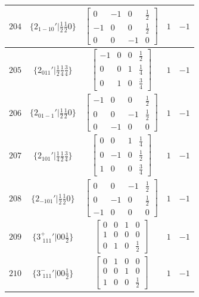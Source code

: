 \documentclass[fleqn,8pt]{jsarticle}
\begin{document}
\begin{longtable}{ccccc}
$ 204 $ & $ \{2{}_{1-10}{}'|\frac{1}{2} \frac{1}{2} 0\} $ & $ \begin{bmatrix} 0 & -1 & 0 & \frac{1}{2} \\ -1 & 0 & 0 & \frac{1}{2} \\ 0 & 0 & -1 & 0 \end{bmatrix} $ & $ 1 $ & $ -1 $ \\ \hline
$ 205 $ & $ \{2{}_{011}{}'|\frac{1}{2} \frac{1}{4} \frac{3}{4}\} $ & $ \begin{bmatrix} -1 & 0 & 0 & \frac{1}{2} \\ 0 & 0 & 1 & \frac{1}{4} \\ 0 & 1 & 0 & \frac{3}{4} \end{bmatrix} $ & $ 1 $ & $ -1 $ \\ \hline
$ 206 $ & $ \{2{}_{01-1}{}'|\frac{1}{2} \frac{1}{2} 0\} $ & $ \begin{bmatrix} -1 & 0 & 0 & \frac{1}{2} \\ 0 & 0 & -1 & \frac{1}{2} \\ 0 & -1 & 0 & 0 \end{bmatrix} $ & $ 1 $ & $ -1 $ \\ \hline
$ 207 $ & $ \{2{}_{101}{}'|\frac{1}{4} \frac{1}{2} \frac{3}{4}\} $ & $ \begin{bmatrix} 0 & 0 & 1 & \frac{1}{4} \\ 0 & -1 & 0 & \frac{1}{2} \\ 1 & 0 & 0 & \frac{3}{4} \end{bmatrix} $ & $ 1 $ & $ -1 $ \\ \hline
$ 208 $ & $ \{2{}_{-101}{}'|\frac{1}{2} \frac{1}{2} 0\} $ & $ \begin{bmatrix} 0 & 0 & -1 & \frac{1}{2} \\ 0 & -1 & 0 & \frac{1}{2} \\ -1 & 0 & 0 & 0 \end{bmatrix} $ & $ 1 $ & $ -1 $ \\ \hline
$ 209 $ & $ \{3^{+}_{\,\,111}{}'|0 0 \frac{1}{2}\} $ & $ \begin{bmatrix} 0 & 0 & 1 & 0 \\ 1 & 0 & 0 & 0 \\ 0 & 1 & 0 & \frac{1}{2} \end{bmatrix} $ & $ 1 $ & $ -1 $ \\ \hline
$ 210 $ & $ \{3^{-}_{\,\,111}{}'|0 0 \frac{1}{2}\} $ & $ \begin{bmatrix} 0 & 1 & 0 & 0 \\ 0 & 0 & 1 & 0 \\ 1 & 0 & 0 & \frac{1}{2} \end{bmatrix} $ & $ 1 $ & $ -1 $ \\ \hline

\end{longtable}
\end{document}

